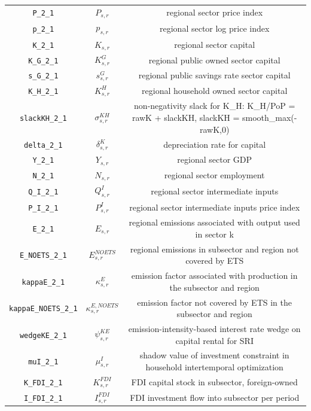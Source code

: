\begin{center}
\begin{longtable}{ccc}
\texttt{P\_2\_1} & ${P_{s,r}}$ & regional sector price index\\
\texttt{p\_2\_1} & ${p_{s,r}}$ & regional sector log price index\\
\texttt{K\_2\_1} & ${K_{s,r}}$ & regional sector capital\\
\texttt{K\_G\_2\_1} & ${K^G_{s,r}}$ & regional public owned sector capital\\
\texttt{s\_G\_2\_1} & ${s^G_{s,r}}$ & regional public savings rate sector capital\\
\texttt{K\_H\_2\_1} & ${K^H_{s,r}}$ & regional household owned sector capital\\
\texttt{slackKH\_2\_1} & ${\sigma^{KH}_{s,r}}$ & non-negativity slack for K\_H: K\_H/PoP = rawK + slackKH, slackKH = smooth\_max(-rawK,0)\\
\texttt{delta\_2\_1} & ${\delta^{K}_{s,r}}$ & depreciation rate for capital\\
\texttt{Y\_2\_1} & ${Y_{s,r}}$ & regional sector GDP\\
\texttt{N\_2\_1} & ${N_{s,r}}$ & regional sector employment\\
\texttt{Q\_I\_2\_1} & ${Q^{I}_{s,r}}$ & regional sector intermediate inputs\\
\texttt{P\_I\_2\_1} & ${P^{I}_{s,r}}$ & regional sector intermediate inputs price index\\
\texttt{E\_2\_1} & ${E_{s,r}}$ & regional emissions associated with output used in sector k\\
\texttt{E\_NOETS\_2\_1} & ${E^{NOETS}_{s,r}}$ & regional emissions in subsector and region not covered by ETS\\
\texttt{kappaE\_2\_1} & ${\kappa^{E}_{s,r}}$ & emission factor associated with production in the subsector and region\\
\texttt{kappaE\_NOETS\_2\_1} & ${\kappa^{E,NOETS}_{s,r}}$ & emission factor not covered by ETS in the subsector and region\\
\texttt{wedgeKE\_2\_1} & ${\psi^{KE}_{s,r}}$ & emission-intensity-based interest rate wedge on capital rental for SRI\\
\texttt{muI\_2\_1} & ${\mu^{I}_{s,r}}$ & shadow value of investment constraint in household intertemporal optimization\\
\texttt{K\_FDI\_2\_1} & ${K^{FDI}_{s,r}}$ & FDI capital stock in subsector, foreign-owned\\
\texttt{I\_FDI\_2\_1} & ${I^{FDI}_{s,r}}$ & FDI investment flow into subsector per period\\

\end{longtable}
\end{center}
